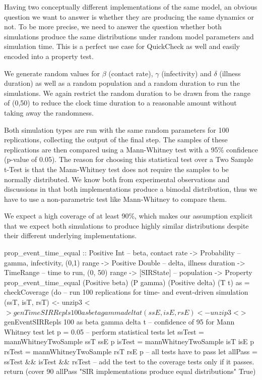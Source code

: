 Having two conceptually different implementations of the same model, an obvious question we want to answer is whether they are producing the same dynamics or not. To be more precise, we need to answer the question whether both simulations produce the same distributions under random model parameters and simulation time. This is a perfect use case for QuickCheck as well and easily encoded into a property test.

We generate random values for $\beta$ (contact rate), $\gamma$ (infectivity) and $\delta$ (illness duration) as well as a random population and a random duration to run the simulations. We again restrict the random duration to be drawn from the range of (0,50) to reduce the clock time duration to a reasonable amount without taking away the randomness.

Both simulation types are run with the same random parameters for 100 replications, collecting the output of the final step. The samples of these replications are then compared using a Mann-Whitney test with a 95\% confidence (p-value of 0.05). The reason for choosing this statistical test over a Two Sample t-Test is that the Mann-Whitney test does not require the samples to be normally distributed. We know both from experimental observations and discussions in \cite{macal_agent-based_2010} that both implementations produce a bimodal distribution, thus we have to use a non-parametric test like Mann-Whitney to compare them.


We expect a high coverage of at least 90\%, which makes our assumption explicit that we expect both simulations to produce highly similar distributions despite their different underlying implementations.

\begin{HaskellCode}
prop_event_time_equal :: Positive Int    -- beta, contact rate
                      -> Probability     -- gamma, infectivity, (0,1) range
                      -> Positive Double -- delta, illness duration
                      -> TimeRange       -- time to run, (0, 50) range
                      -> [SIRState]      -- population 
                      -> Property
prop_event_time_equal
    (Positive beta) (P gamma) (Positive delta) (T t) as = checkCoverage (do
  -- run 100 replications for time- and event-driven simulation
  (ssT, isT, rsT) <- unzip3 <$> genTimeSIRRepls 100 as beta gamma delta t
  (ssE, isE, rsE) <- unzip3 <$> genEventSIRRepls 100 as beta gamma delta t
  -- confidence of 95 for Mann Whitney test
  let p = 0.05
  -- perform statistical tests
  let ssTest = mannWhitneyTwoSample ssT ssE p
      isTest = mannWhitneyTwoSample isT isE p
      rsTest = mannWhitneyTwoSample rsT rsE p
  -- all tests have to pass
  let allPass = ssTest && isTest && rsTest 
  -- add the test to the coverage tests only if it passes.
  return 
    (cover 90 allPass "SIR implementations produce equal distributions" True)
\end{HaskellCode}

